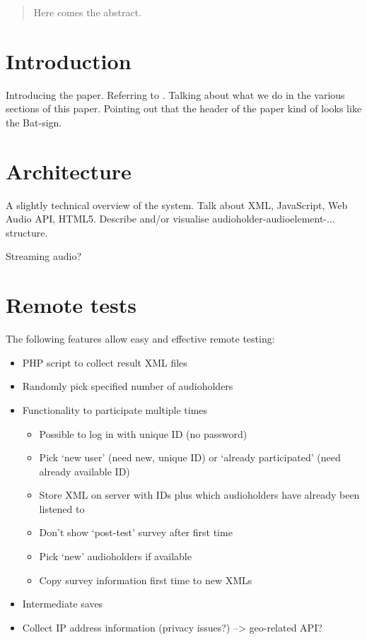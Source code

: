 \documentclass{sig-alternate}
\begin{document}
\maketitle
\begin{abstract}
Here comes the abstract. 
\end{abstract}


\section{Introduction}
	Introducing the paper. Referring to \cite{waet}. Talking about what we do in the various sections of this paper. Pointing out that the header of the paper kind of looks like the Bat-sign. 
	
\section{Architecture}
	A slightly technical overview of the system. Talk about XML, JavaScript, Web Audio API, HTML5. 
	Describe and/or visualise audioholder-audioelement-... structure.
	
	Streaming audio? 
	
	
\section{Remote tests}
	The following features allow easy and effective remote testing: 
	\begin{itemize}
		\item PHP script to collect result XML files
		\item Randomly pick specified number of audioholders
		\item Functionality to participate multiple times
			\begin{itemize}
				\item Possible to log in with unique ID (no password)
				\item Pick `new user' (need new, unique ID) or `already participated' (need already available ID)
				\item Store XML on server with IDs plus which audioholders have already been listened to
				\item Don't show `post-test' survey after first time
				\item Pick `new' audioholders if available
				\item Copy survey information first time to new XMLs
			\end{itemize}
		\item Intermediate saves
		\item Collect IP address information (privacy issues?) --> geo-related API? 
	\end{itemize}
\end{document}
